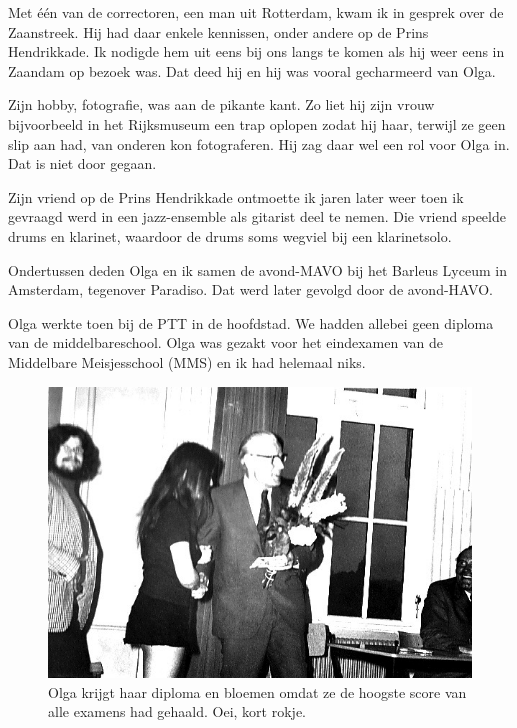 \documentclass[12pt,twoside, openright]{memoir}
\begin{document}
Met één van de correctoren, een man uit Rotterdam, kwam ik in gesprek over de Zaanstreek. Hij had daar enkele kennissen, onder andere op de Prins Hendrikkade. Ik nodigde hem uit eens bij ons langs te komen als hij weer eens in Zaandam op bezoek was. Dat deed hij en hij was vooral gecharmeerd van Olga. 

Zijn hobby, fotografie, was aan de pikante kant. Zo liet hij  zijn vrouw bijvoorbeeld in het Rijksmuseum een trap oplopen zodat hij haar, terwijl ze geen slip aan had, van onderen kon fotograferen. Hij zag daar wel een rol voor Olga in. Dat is niet door gegaan. 

Zijn vriend op de Prins Hendrikkade ontmoette ik jaren later weer toen ik gevraagd werd in een jazz-ensemble als gitarist deel te nemen. Die vriend speelde drums en klarinet, waardoor  de drums soms wegviel bij een klarinetsolo.

Ondertussen deden Olga en ik samen de avond-MAVO bij het Barleus Lyceum in Amsterdam, tegenover Paradiso. Dat werd later gevolgd door de avond-HAVO.

Olga werkte toen bij de PTT in de hoofdstad. We hadden allebei geen diploma van de middelbareschool. Olga was gezakt voor het eindexamen van de Middelbare Meisjesschool (MMS) en ik had helemaal niks.

\begin{figure}[h]
\centering
\includegraphics[width=\textwidth]{img/236barleus_0004}
\caption*{\footnotesize Olga krijgt haar diploma en bloemen omdat ze de hoogste score van alle examens had gehaald. Oei, kort rokje.}
\end{figure}
\end{document}
